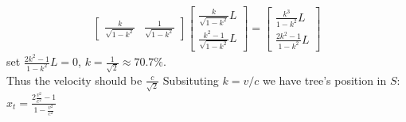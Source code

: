 \documentclass{article}
\begin{document}
\begin{itemize}
\begin{itemize}
\begin{itemize}
\begin{align*}
\begin{bmatrix}
                                \frac{k}{\sqrt{1-k^2}}&\frac{1}{\sqrt{1-k^2}}
                            \end{bmatrix}
                            \begin{bmatrix}
                                \frac{k}{\sqrt{1-k^2}}L\\ \frac{k^2-1}{\sqrt{1-k^2}}L
                            \end{bmatrix}=
                            \begin{bmatrix}
                                \frac{k^3}{1-k^2}L \\ \frac{2k^2-1}{1-k^2}L
                            \end{bmatrix}
                        \end{align*}
                        set \(\frac{2k^2-1}{1-k^2}L = 0\), \(k = \frac{1}{\sqrt 2}\approx 70.7\%\).\\ Thus the velocity should be \(\frac{c}{\sqrt2}\)
                        Subsituting \(k = v/c\) we have tree's position in \(S\): \(x_{t} = \frac{2\frac{v^2}{c^2}-1}{1-\frac{v^2}{c^2}}\)
        

\end{itemize}
\end{itemize}
\end{itemize}
\end{document}

